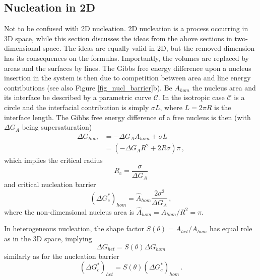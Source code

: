     \subsection{Nucleation in 2D}
    Not to be confused with 2D nucleation. 2D nucleation is a process occurring in 3D space, while this section discusses the ideas from the above sections in two-dimensional space. The ideas are equally valid in 2D, but the removed dimension has its consequences on the formulas. Importantly, the volumes are replaced by areas and the surfaces by lines. The Gibbs free energy difference upon a nucleus insertion in the system is then due to competition between area and line energy contributions (see also Figure \ref{fig_nucl_barrier}b). Be $A_{hom}$ the nucleus area and its interface be described by a parametric curve $\mathcal{C}$. In the isotropic case $\mathcal{C}$ is a circle and the interfacial contribution is simply $\sigma L$, where $L=2\pi R$ is the interface length. The Gibbs free energy difference of a free nucleus is then (with $\Delta G_A$ being supersaturation)
    \begin{align}
        \Delta G_{hom} &= -\Delta G_A A_{hom} + \sigma L \\
            &= (-\Delta G_A R^2 + 2R\sigma)\pi \,,
    \end{align}
    which implies the critical radius
    \begin{equation} \label{eq_crit_radius_2D}
        R_c = \frac{\sigma}{\Delta G_A}
    \end{equation}
    and critical nucleation barrier
    \begin{equation} 
        (\Delta G_c^*)_{hom} = \hat{A}_{hom}\frac{2\sigma^2}{\Delta G_A}\,,
    \end{equation}
    where the non-dimensional nucleus area is $\hat{A}_{hom}=A_{hom}/R^2=\pi$.
    
    In heterogeneous nucleation, the shape factor $S(\theta)=A_{het}/A_{hom}$ has equal role as in the 3D space, implying
    \begin{equation}\label{eq_DG_het_2D}
        \Delta G_{het} = S(\theta)\Delta G_{hom}
    \end{equation}
    similarly as for the nucleation barrier
    \begin{equation}\label{eq_nucl_barr_het_2D}
        (\Delta G_c^*)_{het} = S(\theta)(\Delta G_c^*)_{hom}\,.
    \end{equation}
    
